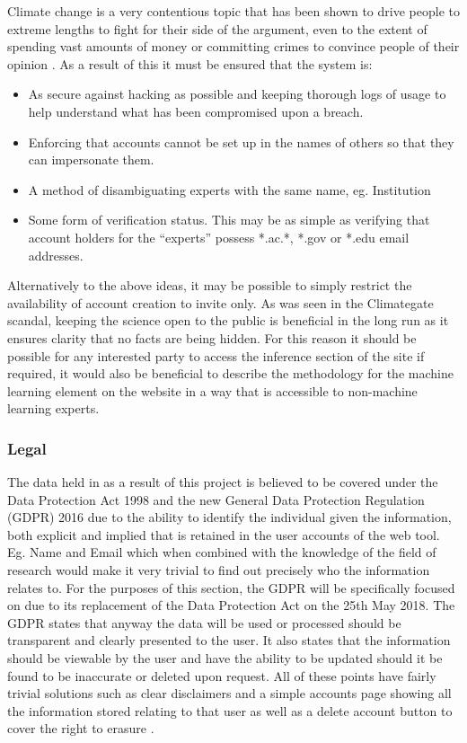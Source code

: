 \documentclass{ecmm427_assignment}
\begin{document}
 Climate change is a very contentious topic that has been shown to
drive people to extreme lengths to fight for their side of the argument,
even to the extent of spending vast amounts of money or committing
crimes to convince people of their opinion \cite{nerlich2010climategate}. As a result
of this it must be ensured that the system is:
\begin{itemize}
\item As secure against hacking as possible and keeping thorough logs of
usage to help understand what has been compromised upon a breach.
\item Enforcing that accounts cannot be set up in the names of others so
that they can impersonate them. 
\item A method of disambiguating experts with the same name, eg. Institution
\item Some form of verification status. This may be as simple as verifying
that account holders for the ``experts'' possess {*}.ac.{*}, {*}.gov
or {*}.edu email addresses. 
\end{itemize}
 Alternatively to the above ideas, it may be possible to simply restrict
the availability of account creation to invite only. As was seen in
the Climategate scandal, keeping the science open to the public is
beneficial in the long run as it ensures clarity that no facts are
being hidden. For this reason it should be possible for any interested
party to access the inference section of the site if required, it
would also be beneficial to describe the methodology for the machine learning
element on the website in a way that is accessible to non-machine
learning experts.

\subsubsection{Legal}

 The data held in as a result of this project is believed to be covered
under the Data Protection Act 1998 and the new General Data Protection
Regulation (GDPR) 2016 due to the ability to identify the individual
given the information, both explicit and implied that is retained in
the user accounts of the web tool. Eg. Name and Email which when combined
with the knowledge of the field of research would make it very trivial
to find out precisely who the information relates to. For the purposes
of this section, the GDPR will be specifically focused on due to its
replacement of the Data Protection Act on the 25th May 2018. The GDPR
states that anyway the data will be used or processed should be
transparent and clearly presented to the user. It also states that
the information should be viewable by the user and have the ability
to be updated should it be found to be inaccurate or deleted upon
request. All of these points have fairly trivial solutions such as
clear disclaimers and a simple accounts page showing all the information
stored relating to that user as well as a delete account button to
cover the right to erasure \cite{eu:gdpr}. 
\end{document}
